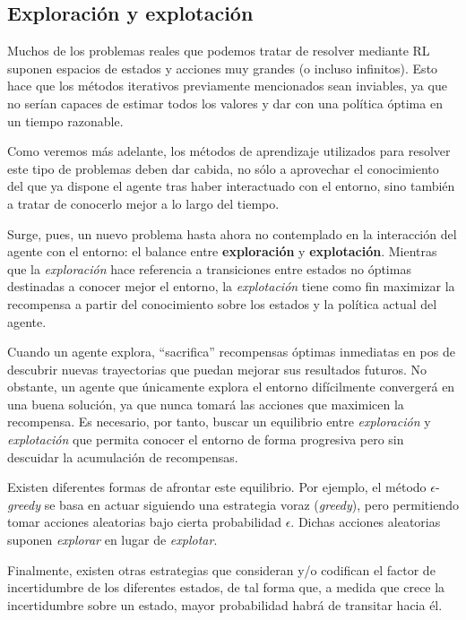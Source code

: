 \subsection{Exploración y explotación}

Muchos de los problemas reales que podemos tratar de resolver mediante RL suponen espacios de estados y acciones muy grandes (o incluso infinitos). Esto hace que los métodos iterativos previamente mencionados sean inviables, ya que no serían capaces de estimar todos los valores y dar con una política óptima en un tiempo razonable. 

Como veremos más adelante, los métodos de aprendizaje utilizados para resolver este tipo de problemas deben dar cabida, no sólo a aprovechar el conocimiento del que ya dispone el agente tras haber interactuado con el entorno, sino también a tratar de conocerlo mejor a lo largo del tiempo.

Surge, pues, un nuevo problema hasta ahora no contemplado en la interacción del agente con el entorno: el balance entre \textbf{exploración} y \textbf{explotación}. Mientras que la \textit{exploración} hace referencia a transiciones entre estados no óptimas destinadas a conocer mejor el entorno, la \textit{explotación} tiene como fin maximizar la recompensa a partir del conocimiento sobre los estados y la política actual del agente.

Cuando un agente explora, ``sacrifica'' recompensas óptimas inmediatas en pos de descubrir nuevas trayectorias que puedan mejorar sus resultados futuros. No obstante, un agente que únicamente explora el entorno difícilmente convergerá en una buena solución, ya que nunca tomará las acciones que maximicen la recompensa. Es necesario, por tanto, buscar un equilibrio entre \textit{exploración} y \textit{explotación} que permita conocer el entorno de forma progresiva pero sin descuidar la acumulación de recompensas.

Existen diferentes formas de afrontar este equilibrio. Por ejemplo, el método $\epsilon$-\textit{greedy} se basa en actuar siguiendo una estrategia voraz (\textit{greedy}), pero permitiendo tomar acciones aleatorias bajo cierta probabilidad $\epsilon$. Dichas acciones aleatorias suponen \textit{explorar} en lugar de \textit{explotar}.

Finalmente, existen otras estrategias que consideran y/o codifican el factor de incertidumbre de los diferentes estados, de tal forma que, a medida que crece la incertidumbre sobre un estado, mayor probabilidad habrá de transitar hacia él.


